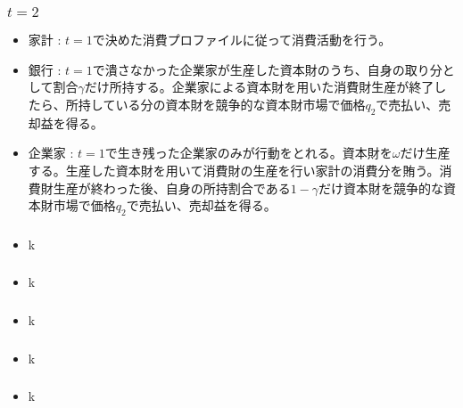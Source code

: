 \documentclass[dvipdfmx, 12pt]{beamer}
\begin{document}
\begin{frame}\frametitle{$t = 2$}
	\begin{itemize}
		\item 家計 : $t=1$で決めた消費プロファイルに従って消費活動を行う。
		\item 銀行 : $t = 1$で潰さなかった企業家が生産した資本財のうち、自身の取り分として割合$\gamma$だけ所持する。企業家による資本財を用いた消費財生産が終了したら、所持している分の資本財を競争的な資本財市場で価格$q_2$で売払い、売却益を得る。
		\item 企業家 : $t = 1$で生き残った企業家のみが行動をとれる。資本財を$\omega$だけ生産する。生産した資本財を用いて消費財の生産を行い家計の消費分を賄う。消費財生産が終わった後、自身の所持割合である$1-\gamma$だけ資本財を競争的な資本財市場で価格$q_2$で売払い、売却益を得る。
	\end{itemize}
\end{frame}

\begin{frame}\frametitle{}
	\begin{itemize}
		\item k
	\end{itemize}
\end{frame}

\begin{frame}\frametitle{}
	\begin{itemize}
		\item k
	\end{itemize}
\end{frame}

\begin{frame}\frametitle{}
	\begin{itemize}
		\item k
	\end{itemize}
\end{frame}

\begin{frame}\frametitle{}
	\begin{itemize}
		\item k
	\end{itemize}
\end{frame}

\begin{frame}\frametitle{}
	\begin{itemize}
		\item k
	\end{itemize}
\end{frame}
\end{document}
